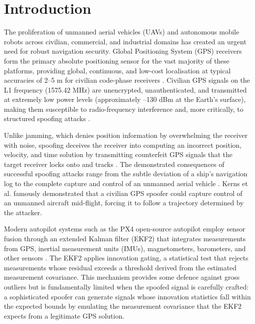 \documentclass[electronics,article,accept,moreauthors]{Definitions/mdpi}
\begin{document}
\section{Introduction}
\label{sec:introduction}

The proliferation of unmanned aerial vehicles (UAVs) and autonomous mobile robots across civilian, commercial, and industrial domains has created an urgent need for robust navigation security. Global Positioning System (GPS) receivers form the primary absolute positioning sensor for the vast majority of these platforms, providing global, continuous, and low-cost localisation at typical accuracies of 2--5 m for civilian code-phase receivers \citep{humphreys2012}. Civilian GPS signals on the L1 frequency (1575.42 MHz) are unencrypted, unauthenticated, and transmitted at extremely low power levels (approximately --130 dBm at the Earth's surface), making them susceptible to radio-frequency interference and, more critically, to structured spoofing attacks \citep{schmidt2016}.

Unlike jamming, which denies position information by overwhelming the receiver with noise, spoofing deceives the receiver into computing an incorrect position, velocity, and time solution by transmitting counterfeit GPS signals that the target receiver locks onto and tracks \citep{kerns2014}. The demonstrated consequences of successful spoofing attacks range from the subtle deviation of a ship's navigation log to the complete capture and control of an unmanned aerial vehicle \citep{humphreys2012,bhatti2017}. Kerns et al. \citep{kerns2014} famously demonstrated that a civilian GPS spoofer could capture control of an unmanned aircraft mid-flight, forcing it to follow a trajectory determined by the attacker.

Modern autopilot systems such as the PX4 open-source autopilot employ sensor fusion through an extended Kalman filter (EKF2) that integrates measurements from GPS, inertial measurement units (IMUs), magnetometers, barometers, and other sensors \citep{px4docs}. The EKF2 applies innovation gating, a statistical test that rejects measurements whose residual exceeds a threshold derived from the estimated measurement covariance. This mechanism provides some defence against gross outliers but is fundamentally limited when the spoofed signal is carefully crafted: a sophisticated spoofer can generate signals whose innovation statistics fall within the expected bounds by emulating the measurement covariance that the EKF2 expects from a legitimate GPS solution.
\end{document}
